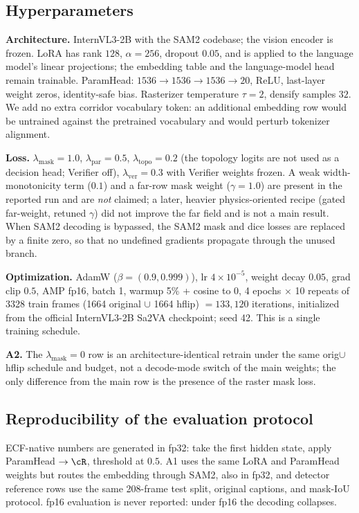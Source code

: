 \subsection{Hyperparameters}
\label{app:hparams}

\textbf{Architecture.} InternVL3-2B with the SAM2 codebase; the vision encoder is frozen.
LoRA has rank $128$, $\alpha{=}256$, dropout $0.05$, and is applied to the language model's linear projections; the embedding table and the language-model head remain trainable.
ParamHead: $1536 \to 1536 \to 1536 \to 20$, ReLU, last-layer weight zeros, identity-safe bias.
Rasterizer temperature $\tau{=}2$, densify samples $32$.
We add no extra corridor vocabulary token: an additional embedding row would be untrained against the pretrained vocabulary and would perturb tokenizer alignment.

\textbf{Loss.} $\lambda_{\mathrm{mask}}{=}1.0$, $\lambda_{\mathrm{par}}{=}0.5$, $\lambda_{\mathrm{topo}}{=}0.2$ (the topology logits are not used as a decision head; Verifier off), $\lambda_{\mathrm{ver}}{=}0.3$ with Verifier weights frozen.
A weak width-monotonicity term ($0.1$) and a far-row mask weight ($\gamma{=}1.0$) are present in the reported run and are \emph{not} claimed; a later, heavier physics-oriented recipe (gated far-weight, retuned $\gamma$) did not improve the far field and is not a main result.
When SAM2 decoding is bypassed, the SAM2 mask and dice losses are replaced by a finite zero, so that no undefined gradients propagate through the unused branch.

\textbf{Optimization.} AdamW ($\beta{=}(0.9,0.999)$), lr $4{\times}10^{-5}$, weight decay $0.05$, grad clip $0.5$, AMP fp16, batch 1, warmup 5\% + cosine to 0, 4 epochs $\times$ 10 repeats of 3328 train frames (1664 original $\cup$ 1664 hflip) $= 133{,}120$ iterations, initialized from the official InternVL3-2B Sa2VA checkpoint; seed 42.
This is a single training schedule.

\textbf{A2.} The $\lambda_{\mathrm{mask}}{=}0$ row is an architecture-identical retrain under the same orig$\cup$hflip schedule and budget, not a decode-mode switch of the main weights; the only difference from the main row is the presence of the raster mask loss.

\subsection{Reproducibility of the evaluation protocol}
\label{app:repro}

ECF-native numbers are generated in fp32: take the first \Seg{} hidden state, apply ParamHead $\to \cR$, threshold at $0.5$.
A1 uses the same LoRA and ParamHead weights but routes the \Seg{} embedding through SAM2, also in fp32, and detector reference rows use the same 208-frame test split, original captions, and mask-IoU protocol.
fp16 evaluation is never reported: under fp16 the \Seg{} decoding collapses.
